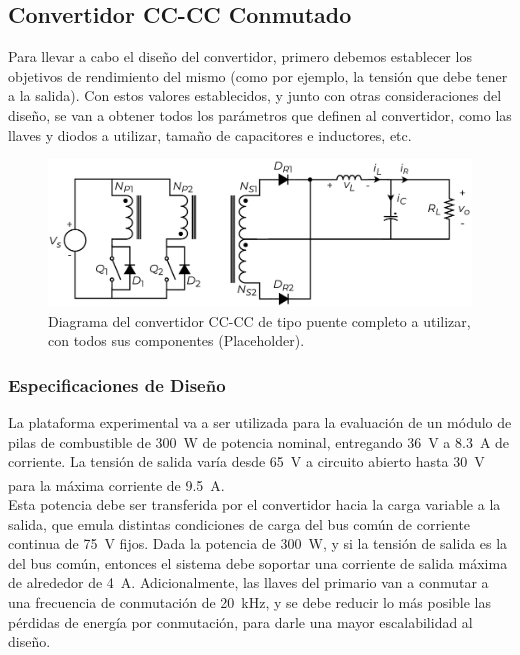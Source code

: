 \subsection{Convertidor CC-CC Conmutado}

Para llevar a cabo el diseño del convertidor, primero debemos establecer los objetivos de rendimiento del mismo (como por ejemplo, la tensión que debe tener a la salida). Con estos valores establecidos, y junto con otras consideraciones del diseño, se van a obtener todos los parámetros que definen al convertidor, como las llaves y diodos a utilizar, tamaño de capacitores e inductores, etc.\\

\begin{figure}[h]
    \centering
    \includegraphics[scale=0.6]{Imagenes/Push-Pull.pdf}
    \caption{Diagrama del convertidor CC-CC de tipo puente completo a utilizar, con todos sus componentes (Placeholder).}
    \label{puente_completo}
\end{figure}

\subsubsection{Especificaciones de Diseño}

La plataforma experimental va a ser utilizada para la evaluación de un módulo de pilas de combustible de \SI[]{300}[]{\watt} de potencia nominal, entregando \SI[]{36}[]{\volt} a \SI[]{8.3}[]{\ampere} de corriente. La tensión de salida varía desde \SI[]{65}[]{\volt} a circuito abierto hasta \SI[]{30}[]{\volt} para la máxima corriente de \SI[]{9.5}[]{\ampere}.\textsuperscript{\cite{HSeriesBrochure}}\\

Esta potencia debe ser transferida por el convertidor hacia la carga variable a la salida, que emula distintas condiciones de carga del bus común de corriente continua de \SI[]{75}[]{\volt} fijos. Dada la potencia de \SI[]{300}[]{\watt}, y si la tensión de salida es la del bus común, entonces el sistema debe soportar una corriente de salida máxima de alrededor de \SI[]{4}[]{\ampere}. Adicionalmente, las llaves del primario van a conmutar a una frecuencia de conmutación de \SI[]{20}[]{\kilo\hertz}, y se debe reducir lo más posible las pérdidas de energía por conmutación, para darle una mayor escalabilidad al diseño.\\

